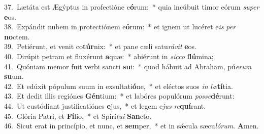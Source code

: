 {37.~}Lætáta est Ægýptus in profectióne e\textbf{ó}rum:~* quia incúbuit timor eórum \textit{su}\textit{per} \textbf{e}os.\\
{38.~}Expándit nubem in protectiónem e\textbf{ó}rum:~* et ignem ut lucéret e\textit{is} \textit{per} \textbf{no}ctem.\\
{39.~}Petiérunt, et venit co\textbf{túr}nix:~* et pane cæli satu\textit{rá}\textit{vit} \textbf{e}os.\\
{40.~}Dirúpit petram et fluxérunt \textbf{a}quæ:~* abiérunt in \textit{sic}\textit{co} \textbf{flú}mina;\\
{41.~}Quóniam memor fuit verbi sancti \textbf{su}i:~* quod hábuit ad Abraham, pú\textit{e}\textit{rum} \textbf{su}um.\\
{42.~}Et edúxit pópulum suum in exsultati\textbf{ó}ne,~* et eléctos suos \textit{in} \textit{læ}\textbf{tí}tia.\\
{43.~}Et dedit illis regiónes \textbf{Gén}tium:~* et labóres populórum \textit{pos}\textit{se}\textbf{dé}runt:\\
{44.~}Ut custódiant justificatiónes \textbf{e}jus,~* et legem e\textit{jus} \textit{re}\textbf{quí}rant.\\
{45.~}Glória Patri, et \textbf{Fí}lio,~* et Spirí\textit{tu}\textit{i} \textbf{San}cto.\\
{46.~}Sicut erat in princípio, et nunc, et \textbf{sem}per,~* et in sǽcula sæcu\textit{ló}\textit{rum}. \textbf{A}men.\\

